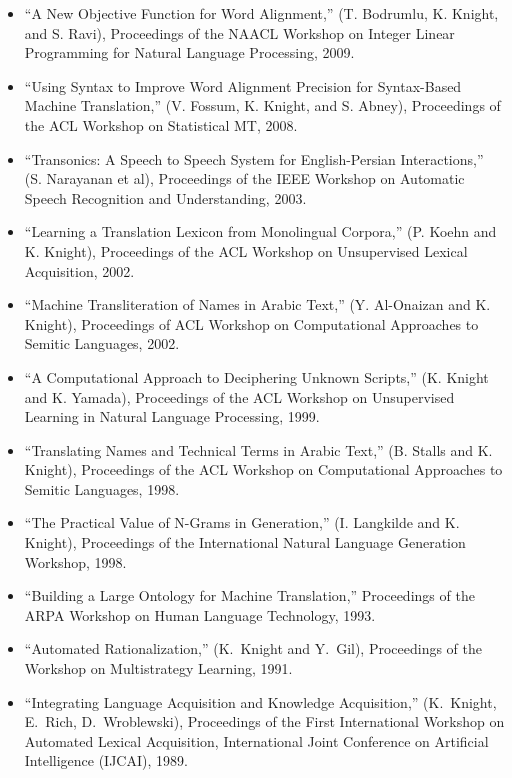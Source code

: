\begin{itemize}
\item ``A New Objective Function for Word Alignment,''
(T. Bodrumlu, K. Knight, and S. Ravi), Proceedings of the NAACL Workshop on
Integer Linear Programming for Natural Language Processing, 2009.

\item ``Using Syntax to Improve Word Alignment Precision for Syntax-Based 
Machine Translation,'' (V. Fossum, K. Knight, and S. Abney), Proceedings of
the ACL Workshop on Statistical MT, 2008. 

\item ``Transonics: A Speech to Speech System for English-Persian
Interactions,'' (S. Narayanan et al), Proceedings of the IEEE Workshop on
Automatic Speech Recognition and Understanding, 2003.

\item ``Learning a Translation Lexicon from Monolingual Corpora,'' (P. Koehn 
and K. Knight), Proceedings of the ACL Workshop on Unsupervised Lexical 
Acquisition, 2002.

\item ``Machine Transliteration of Names in Arabic Text,'' (Y. Al-Onaizan and 
K. Knight), Proceedings of ACL Workshop on Computational Approaches to 
Semitic Languages, 2002.

\item ``A Computational Approach to Deciphering Unknown Scripts,''
(K. Knight and K. Yamada),
Proceedings of the ACL Workshop on Unsupervised Learning in Natural
Language Processing, 1999.

\item ``Translating Names and Technical Terms in Arabic Text,''
(B. Stalls and K. Knight),
Proceedings of the ACL Workshop on Computational Approaches 
to Semitic Languages, 1998.

\item ``The Practical Value of N-Grams in Generation,''
(I. Langkilde and K. Knight), 
Proceedings of the International Natural Language Generation Workshop, 1998.

\item ``Building a Large Ontology for Machine Translation,''
Proceedings of the ARPA Workshop on Human Language Technology, 1993.

\item ``Automated Rationalization,'' (K.~Knight and Y.~Gil),
Proceedings of the Workshop on Multistrategy Learning, 1991.

\item ``Integrating Language Acquisition and Knowledge Acquisition,''
(K.~Knight, E.~Rich, D.~Wroblewski), Proceedings of
the First International Workshop on Automated Lexical Acquisition, 
International Joint Conference on Artificial Intelligence (IJCAI), 1989.
\end{itemize}

